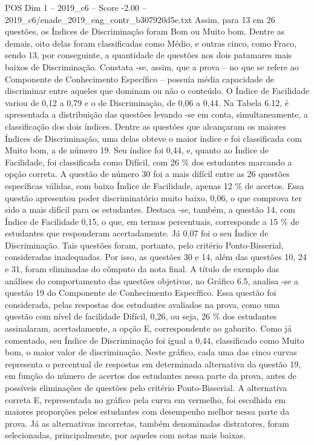 \begin{textsample}{POS Dim 1 – 2019\_c6 – Score -2.00 – 2019\_c6/enade\_2019\_eng\_contr\_b307920d5e.txt}
Assim, para 13 em 26 questões, os Índices de Discriminação foram Bom ou Muito bom.
Dentre as demais, oito delas foram classificadas como Médio, e outras cinco, como Fraco, sendo 13, por conseguinte, a quantidade de questões nos dois patamares mais baixos de Discriminação.
Constata -se, assim, que a prova – no que se refere ao Componente de Conhecimento Específico – possuía média capacidade de discriminar entre aqueles que dominam ou não o conteúdo.
O Índice de Facilidade variou de 0,12 a 0,79 e o de Discriminação, de 0,06 a 0,44.
Na Tabela 6.12, é apresentada a distribuição das questões levando -se em conta, simultaneamente, a classificação dos dois índices.
Dentre as questões que alcançaram os maiores Índices de Discriminação, uma delas obteve o maior índice e foi classificada com Muito bom, a de número 19.
Seu índice foi 0,44, e, quanto ao Índice de Facilidade, foi classificada como Difícil, com 26 \% dos estudantes marcando a opção correta.
A questão de número 30 foi a mais difícil entre as 26 questões específicas válidas, com baixo Índice de Facilidade, apenas 12 \% de acertos.
Essa questão apresentou poder discriminatório muito baixo, 0,06, o que comprova ter sido a mais difícil para os estudantes.
Destaca -se, também, a questão 14, com Índice de Facilidade 0,15, o que, em termos percentuais, corresponde a 15 \% de estudantes que responderam acertadamente.
Já 0,07 foi o seu Índice de Discriminação.
Tais questões foram, portanto, pelo critério Ponto-Bisserial, consideradas inadequadas.
Por isso, as questões 30 e 14, além das questões 10, 24 e 31, foram eliminadas do cômputo da nota final.
A título de exemplo das análises do comportamento das questões objetivas, no Gráfico 6.5, analisa -se a questão 19 do Componente de Conhecimento Específico.
Essa questão foi considerada, pelas respostas dos estudantes avaliados na prova, como uma questão com nível de facilidade Difícil, 0,26, ou seja, 26 \% dos estudantes assinalaram, acertadamente, a opção E, correspondente ao gabarito.
Como já comentado, seu Índice de Discriminação foi igual a 0,44, classificado como Muito bom, o maior valor de discriminação.
Neste gráfico, cada uma das cinco curvas representa o percentual de respostas em determinada alternativa da questão 19, em função do número de acertos dos estudantes nessa parte da prova, antes de possíveis eliminações de questões pelo critério Ponto-Bisserial.
A alternativa correta E, representada no gráfico pela curva em vermelho, foi escolhida em maiores proporções pelos estudantes com desempenho melhor nessa parte da prova.
Já as alternativas incorretas, também denominadas distratores, foram selecionadas, principalmente, por aqueles com notas mais baixas.

\end{textsample}
